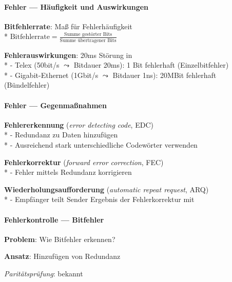 \paragraph{Fehler --- Häufigkeit und Auswirkungen}
\begin{items}
  \item \textbf{Bitfehlerrate}: Maß für Fehlerhäufigkeit \\*
   \( \text{Bitfehlerrate} = \tfrac{\text{Summe gestörter Bits}}{\text{Summe übertragener Bits}} \)
  \item \textbf{Fehlerauswirkungen}: 20ms Störung in \\*
    - Telex (50bit/s \( \leadsto \) Bitdauer 20ms): 1 Bit fehlerhaft (Einzelbitfehler) \\*
    - Gigabit-Ethernet (1Gbit/s \( \leadsto \) Bitdauer 1ns): 20MBit fehlerhaft (Bündelfehler)
\end{items}

\paragraph{Fehler --- Gegenmaßnahmen}
\begin{items}
  \item \textbf{Fehlererkennung} (\emph{error detecting code}, EDC) \\*
    - Redundanz zu Daten hinzufügen \\*
    - Ausreichend stark unterschiedliche Codewörter verwenden
  \item \textbf{Fehlerkorrektur} (\emph{forward error correction}, FEC) \\*
    - Fehler mittels Redundanz korrigieren
  \item \textbf{Wiederholungsaufforderung} (\emph{automatic repeat request}, ARQ) \\*
    - Empfänger teilt Sender Ergebnis der Fehlerkorrektur mit
\end{items}

\paragraph{Fehlerkontrolle --- Bitfehler}
\begin{items}
  \item \textbf{Problem}: Wie Bitfehler erkennen?
  \item \textbf{Ansatz}: Hinzufügen von Redundanz
  \item \emph{Paritätsprüfung}: bekannt
\end{items}

